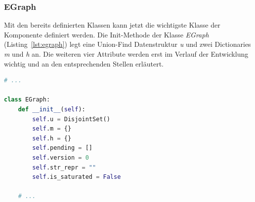 \subsubsection{EGraph}

Mit den bereits definierten Klassen kann jetzt die wichtigste Klasse der Komponente definiert werden. Die Init-Methode der Klasse \textit{EGraph} (Listing~\ref{lst:egraph})
legt eine Union-Find Datenstruktur \textit{u} und zwei Dictionaries \textit{m} und \textit{h} an. Die weiteren vier Attribute werden erst im Verlauf der Entwicklung wichtig und 
an den entsprechenden Stellen erläutert.

\begin{lstlisting}[language=Python, caption=Auszug aus der Klasse \textit{EGraph}, label={lst:egraph}]
# ... 

class EGraph:
    def __init__(self):
        self.u = DisjointSet()
        self.m = {}
        self.h = {}
        self.pending = []
        self.version = 0
        self.str_repr = ""
        self.is_saturated = False

    # ...
\end{lstlisting} 












